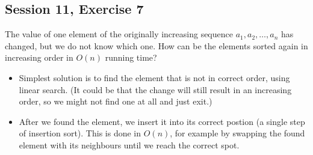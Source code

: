 \subsection {Session 11, Exercise 7}


The value of one element of the originally increasing sequence $a_1,a_2,\dots{},a_n$ has changed, but we do not know which one. How can be the elements sorted again in increasing order in $O(n)$ running time?


\begin{itemize}
    \item Simplest solution is to find the element that is not in correct order, using linear search. (It could be that the change will still result in an increasing order, so we might not find one at all and just exit.)
    \item After we found the element, we insert it into its correct postion (a single step of insertion sort). This is done in $O(n)$, for example by swapping the found element with its neighbours until we reach the correct spot.
\end{itemize}